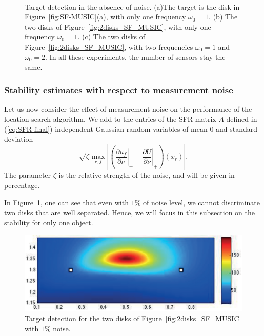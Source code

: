 \begin{figure}[!h]
\centering
{}\\
\caption{Target detection in the absence of
noise.
(a)The target is the
disk in Figure~\ref{fig:SF-MUSIC}(a), with only one frequency $\omega_0=1$.
(b) The two disks of Figure~\ref{fig:2disks_SF_MUSIC},
with only one frequency $\omega_0=1$.
(c) The two disks of Figure~\ref{fig:2disks_SF_MUSIC},
with two frequencies $\omega_0=1$ and $\omega_0=2$.
In all these experiments, the number of
sensors stay the same.}
\end{figure}

\subsubsection*{Stability estimates with respect to measurement noise}

Let us now consider the effect of measurement noise on the
performance of the location search algorithm. We add to the
entries of the SFR matrix $A$ defined in (\ref{eq:SFR-final})
independent Gaussian random variables of mean $0$ and standard
deviation
\[
\sqrt{\zeta}\max_{r,f}\left|\left(\left.\frac{\partial
u_{f}}{\partial\nu}\right|_{+}-\left.\frac{\partial
U}{\partial\nu}\right|_{+}\right)(x_{r})\right|.
\]
The parameter $\zeta$ is the relative strength of the noise, and
will be given in percentage.

In Figure~\ref{fig:2disks_SF_MUSIC_1noise}, one can see that even with $1\%$ of
noise level, we cannot discriminate two disks that are well separated. Hence,
we will focus in this subsection on the stability for only one object. 

\begin{figure}[!h]
\centering
\includegraphics[width=.45\textwidth]{model/2disks_1noise.eps}
\caption{Target detection for the two disks of Figure~\ref{fig:2disks_SF_MUSIC}
with $1\%$ noise.\label{fig:2disks_SF_MUSIC_1noise}}
\end{figure}


